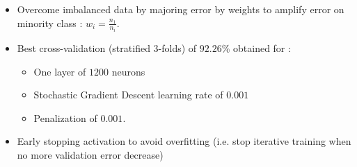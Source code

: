 \documentclass[c]{beamer}
\begin{document}
\begin{frame}
\begin{itemize}
 \item Overcome imbalanced data by majoring error by weights to amplify error on minority class : $w_i=\frac{n_1}{n_i}$.
  \item Best cross-validation (stratified 3-folds) of $92.26$\% obtained for :
  {\scriptsize
  \begin{itemize}
    \item One layer of $1200$ neurons
    \item Stochastic Gradient Descent learning rate of $0.001$ 
    \item Penalization of $0.001$. 
    \end{itemize}
  }
  \item Early stopping activation to avoid overfitting (i.e. stop iterative training when no more validation error decrease)
 \end{itemize}
\end{frame}
\end{document}
